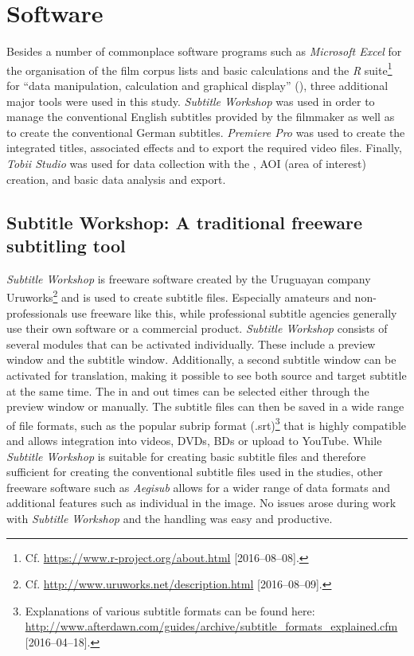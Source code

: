 \section{{Software}}\label{sec:7.2}

Besides a number of commonplace software programs such as \textit{Microsoft Excel} for the organisation of the film corpus lists and basic calculations and the \textit{R} suite\footnote{Cf. \url{https://www.r-project.org/about.html} [2016--08--08].} for “data manipulation, calculation and graphical display” (\citealt{r_project????}), three additional major tools were used in this study. \textit{Subtitle Workshop} was used in order to manage the conventional English subtitles provided by the filmmaker as well as to create the conventional German subtitles. \textit{Premiere Pro} was used to create the integrated titles, associated effects and to export the required video files. Finally, \textit{Tobii Studio} was used for data collection with the , AOI (area of interest) creation, and basic data analysis and export.

\subsection{Subtitle Workshop: A traditional freeware subtitling tool}\label{sec:7.2.1}

\textit{Subtitle Workshop} is freeware software created by the Uruguayan company Uruworks\footnote{Cf. \url{http://www.uruworks.net/description.html} [2016--08--09].} and is used to create subtitle files. Especially amateurs and non-profes\-sion\-als use freeware like this, while professional subtitle agencies generally use their own software or a commercial product. \textit{Subtitle Workshop} consists of several modules that can be activated individually. These include a preview window and the subtitle window. Additionally, a second subtitle window can be activated for translation, making it possible to see both source and target subtitle at the same time. The in and out times can be selected either through the preview window or manually. The subtitle files can then be saved in a wide range of file formats, such as the popular subrip format (.srt)\footnote{Explanations of various subtitle formats can be found here: \url{http://www.afterdawn.com/guides/archive/subtitle\_formats\_explained.cfm} [2016--04--18].} that is highly compatible and allows integration into videos, DVDs, BDs or upload to YouTube. While \textit{Subtitle Workshop} is suitable for creating basic subtitle files and therefore sufficient for creating the conventional subtitle files used in the studies, other freeware software such as \textit{Aegisub} allows for a wider range of data formats and additional features such as individual  in the image. No issues arose during work with \textit{Subtitle Workshop} and the handling was easy and productive.

